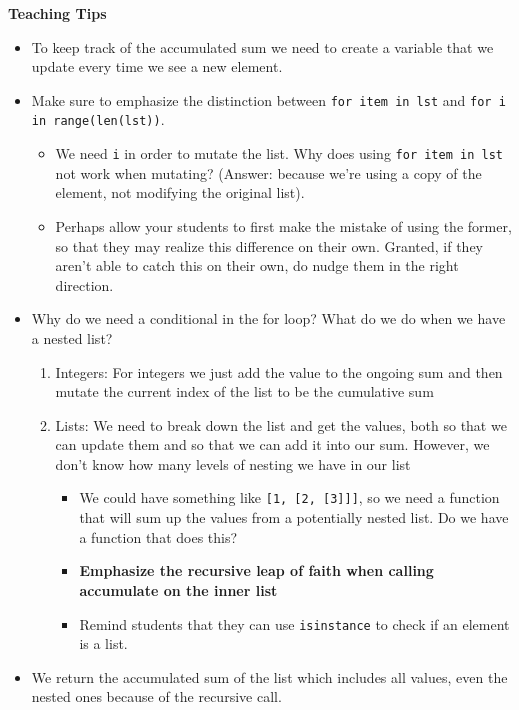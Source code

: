 \begin{guide}
\begin{blocksection}
\textbf{Teaching Tips}

\begin{itemize}
\item To keep track of the accumulated sum we need to create a variable that we update every time we see a new element. 
\item Make sure to emphasize the distinction between \lstinline{for item in lst} and \lstinline{for i in range(len(lst))}.
  \begin{itemize}
    \item We need \lstinline{i} in order to mutate the list. Why does using \lstinline{for item in lst} not work when mutating? (Answer: because we're using a copy of the element, not modifying the original list).
    \item Perhaps allow your students to first make the mistake of using the former, so that they may realize this difference on their own. Granted, if they aren't able to catch this on their own, do nudge them in the right direction. 
  \end{itemize} 
\item Why do we need a conditional in the for loop? What do we do when we have a nested list?
\begin{enumerate}
\item Integers: For integers we just add the value to the ongoing sum and then mutate the current index of the list to be the cumulative sum
\item Lists: We need to break down the list and get the values, both so that we can update them and so that we can add it into our sum.  However, we don’t know how many levels of nesting we have in our list
\begin{itemize} 
\item We could have something like \lstinline{[1, [2, [3]]]}, so we need a function that will sum up the 
values from a potentially nested list.  Do we have a function that does this?
\item \textbf{Emphasize the recursive leap of faith when calling accumulate on the inner list}
\item Remind students that they can use \lstinline{isinstance} to check if an element is a list.
\end{itemize}
\end{enumerate}
\item We return the accumulated sum of the list which includes all values, even the nested ones because of the recursive call.
\end{itemize}
\end{blocksection}
\end{guide}